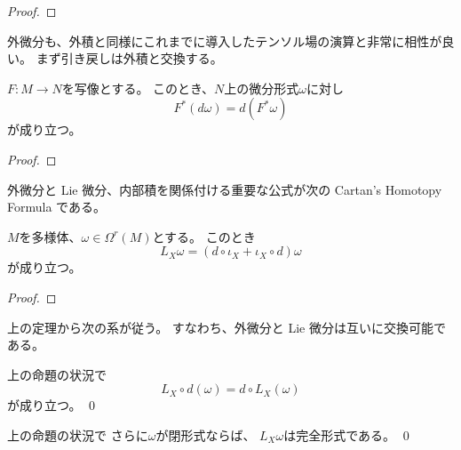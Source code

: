 \documentclass[report]{jlreq}
\begin{document}
\begin{proof}
    \TODO{}
\end{proof}

外微分も、外積と同様にこれまでに導入したテンソル場の演算と非常に相性が良い。
まず引き戻しは外積と交換する。

\begin{proposition}
    $F \colon M \to N$を{\smooth}写像とする。
    このとき、$N$上の微分形式$\omega$に対し
    \begin{equation}
        F^* (d\omega) = d(F^* \omega)
    \end{equation}
    が成り立つ。
\end{proposition}

\begin{proof}
    \TODO{}
\end{proof}

外微分と Lie 微分、内部積を関係付ける重要な公式が次の
Cartan's Homotopy Formula である。

\begin{theorem}
    $M$を多様体、$\omega \in \Omega^r(M)$とする。
    このとき
    \begin{equation}
        L_X \omega
            = (d \circ \iota_X + \iota_X \circ d) \omega
    \end{equation}
    が成り立つ。
\end{theorem}

\begin{proof}
    \TODO{}
\end{proof}

上の定理から次の系が従う。
すなわち、外微分と Lie 微分は互いに交換可能である。

\begin{corollary}
    上の命題の状況で
    \begin{equation}
        L_X \circ d (\omega) = d \circ L_X (\omega)
    \end{equation}
    が成り立つ。
    \qed
\end{corollary}

\begin{corollary}
    上の命題の状況で
    さらに$\omega$が閉形式ならば、
    $L_X \omega$は完全形式である。
    \qed
\end{corollary}





%
\newpage
\end{document}
